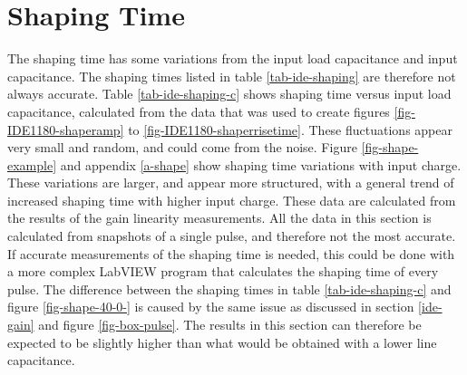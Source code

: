 \documentclass[../main/thesis.tex]{subfiles}
\begin{document}
%


\section{Shaping Time}
\label{ide-shapingtime}

The shaping time has some variations from the input load capacitance and input capacitance. The shaping times listed in table \ref{tab-ide-shaping} are therefore not always accurate. Table \ref{tab-ide-shaping-c} shows shaping time versus input load capacitance, calculated from the data that was used to create figures \ref{fig-IDE1180-shaperamp} to \ref{fig-IDE1180-shaperrisetime}. These fluctuations appear very small and random, and could come from the noise. Figure \ref{fig-shape-example} and appendix \ref{a-shape} show shaping time variations with input charge. These variations are larger, and appear more structured, with a general trend of increased shaping time with higher input charge. These data are calculated from the results of the gain linearity measurements. All the data in this section is calculated from snapshots of a single pulse, and therefore not the most accurate. If accurate measurements of the shaping time is needed, this could be done with a more complex LabVIEW program that calculates the shaping time of every pulse. The difference between the shaping times in table \ref{tab-ide-shaping-c} and figure \ref{fig-shape-40-0-} is caused by the same issue as discussed in section \ref{ide-gain} and figure \ref{fig-box-pulse}. The results in this section can therefore be expected to be slightly higher than what would be obtained with a lower line capacitance. 
\end{document}
